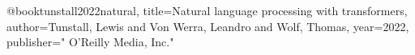 @book{tunstall2022natural,
  title={Natural language processing with transformers},
  author={Tunstall, Lewis and Von Werra, Leandro and Wolf, Thomas},
  year={2022},
  publisher={" O'Reilly Media, Inc."}
}
